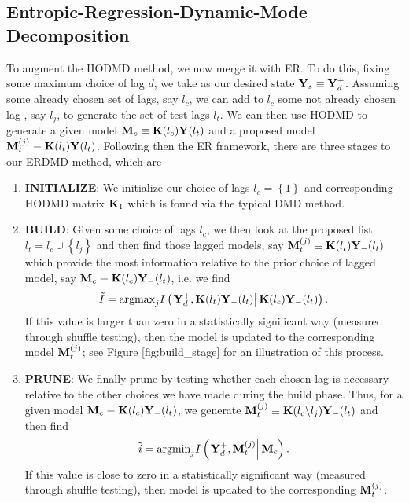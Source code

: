 \documentclass[a4paper,11pt]{article}
\begin{document}
\subsection{Entropic-Regression-Dynamic-Mode Decomposition}
To augment the HODMD method, we now merge it with ER.  To do this, fixing some maximum choice of lag $d$, we take as our desired state ${\bf Y}_{s}\equiv {\bf Y}_{d}^{+}$.  Assuming some already chosen set of lags, say $l_{c}$, we can add to $l_{c}$ some not already chosen lag , say $l_{j}$, to generate the set of test lags $l_{t}$.  We can then use HODMD to generate a given model ${\bf M}_{c}\equiv {\bf K}(l_{c}){\bf Y}(l_{t})$ and a proposed model ${\bf M}_{t}^{(j)}\equiv {\bf K}(l_{t}){\bf Y}(l_{t})$.  Following then the ER framework, there are three stages to our ERDMD method, which are 
\begin{enumerate}
\item {\bf INITIALIZE}: We initialize our choice of lags $l_{c}=\left\{1\right\}$ and corresponding HODMD matrix ${\bf K}_{1}$ which is found via the typical DMD method.    
\item {\bf BUILD}: Given some choice of lags $l_{c}$, we then look at the proposed list $l_{t}=l_{c}\cup \left\{l_{j}\right\}$ and then find those lagged models, say ${\bf M}^{(j)}_{t}\equiv {\bf K}(l_{t}){\bf Y}_{-}(l_{t})$ which provide the most information relative to the prior choice of lagged model, say ${\bf M}_{c}\equiv {\bf K}(l_{c}){\bf Y}_{-}(l_{t})$, i.e. we find 
\begin{equation}
\tilde{I} = \text{argmax}_{j}I\left(\left.{\bf Y}^{+}_{d},{\bf K}(l_{t}){\bf Y}_{-}(l_{t})\right|{\bf K}(l_{c}){\bf Y}_{-}(l_{t})\right).  
\label{build_eqn}
\end{equation}
If this value is larger than zero in a statistically significant way (measured through shuffle testing), then the model is updated to the corresponding model ${\bf M}^{(j)}_{t}$; see Figure \ref{fig:build_stage} for an illustration of this process.    
\item {\bf PRUNE}: We finally prune by testing whether each chosen lag is necessary relative to the other choices we have made during the build phase.  Thus, for a given model ${\bf M}_{c}\equiv {\bf K}(l_{c}){\bf Y}_{-}(l_{t})$, we generate ${\bf M}^{(j)}_{t}\equiv {\bf K}(l_{c}\backslash l_{j}){\bf Y}_{-}(l_{t})$ and then find 
\begin{equation}
\tilde{i} = \text{argmin}_{j}I\left(\left.{\bf Y}^{+}_{d},{\bf M}^{(j)}_{t}\right|{\bf M}_{c}\right).  
\label{prune_eqn}
\end{equation}
If this value is close to zero in a statistically significant way (measured through shuffle testing), then model is updated to the corresponding ${\bf M}^{(j)}_{t}$.  
\end{enumerate}
\end{document}
